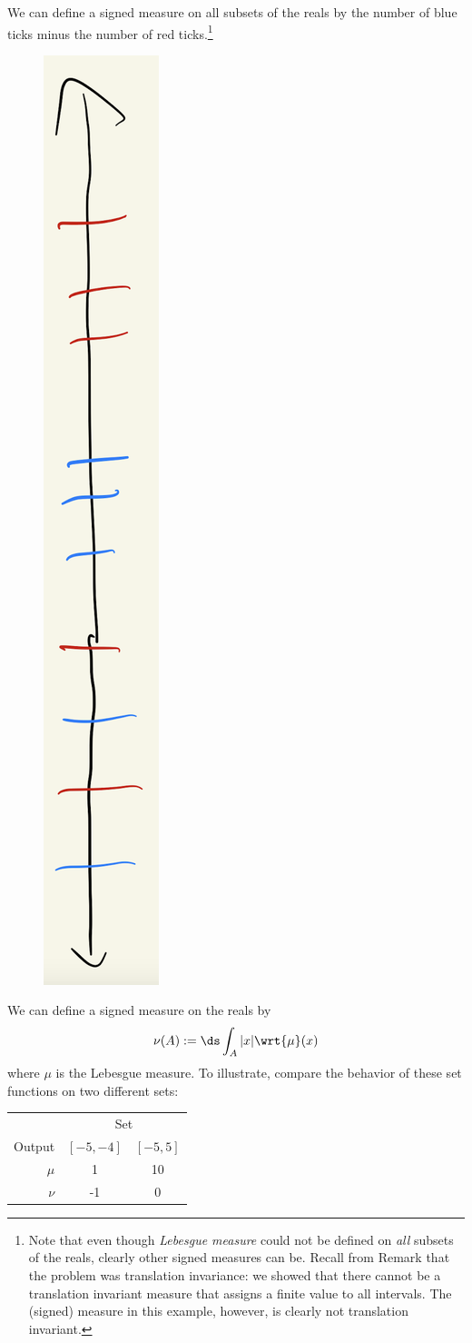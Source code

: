 \documentclass{article} %
\newcommand{\dmu}{\wrt{\mu}}
\begin{document}
\begin{example}

We can define a signed measure on all subsets of the reals by the number of blue ticks minus the number of red ticks.\footnote{Note that even though \textit{Lebesgue measure} could not be defined on \textit{all} subsets of the reals, clearly other signed measures can be.   Recall from Remark \label{rk:implications_of_existence_of_set_that_is_not_Lebesgue_measurable} that the problem was translation invariance:  we showed that there cannot be a translation invariant measure that assigns a finite value to all intervals.  The (signed) measure in this example, however, is clearly not translation invariant.}
  
\begin{figure}[H]
\centering 
\includegraphics[width=.1\linewidth, angle=90]{images/signed_measure_example_with_ticks}
\end{figure}
\label{ex:a_signed_measure_with_ticks}
\end{example}


\begin{example}
We can define a signed measure on the reals by 
\[ \nu(A) := \ds\int_A |x| \dmu(x) \]
where $\mu$ is the Lebesgue measure.    To illustrate, compare the behavior of these set functions on two different sets:

\begin{tabular}{rcc}
& \multicolumn{2}{c}{Set} \\
Output & $[-5,-4]$ & $[-5,5]$\\	
$\mu$ & 1 & 10\\
$\nu$ & -1 & 0\\
\end{tabular}
 	
\end{example}
\end{document}
